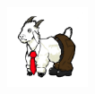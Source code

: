 \begin{figure}
\centering
\includegraphics[width=3.5in,height=0.93in]{ECEWordMark-Tower_black.png}
\end{figure}

\maketitle

\newpage



